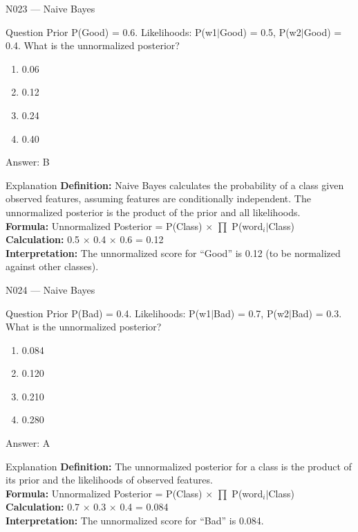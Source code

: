 \documentclass[aspectratio=169,8pt]{beamer}
\begin{document}
	\begin{frame}{N023 --- Naive Bayes}
		\begin{block}{Question}
			Prior P(Good) = 0.6. Likelihoods: P(w1$|$Good) = 0.5, P(w2$|$Good) = 0.4. What is the unnormalized posterior?
			\begin{enumerate}
				\item 0.06
				\item 0.12
				\item 0.24
				\item 0.40
			\end{enumerate}
		\end{block}
		\begin{exampleblock}{Answer: B}\end{exampleblock}
		\begin{block}{Explanation}
			\textbf{Definition:} Naive Bayes calculates the probability of a class given observed features, assuming features are conditionally independent. The unnormalized posterior is the product of the prior and all likelihoods.\\
			\textbf{Formula:} Unnormalized Posterior = P(Class) $\times$ $\prod$ P(word$_{i}$$|$Class)\\
			\textbf{Calculation:} 0.5 $\times$ 0.4 $\times$ 0.6 = 0.12\\
			\textbf{Interpretation:} The unnormalized score for ``Good'' is 0.12 (to be normalized against other classes).
		\end{block}
	\end{frame}
	
	\begin{frame}{N024 --- Naive Bayes}
		\begin{block}{Question}
			Prior P(Bad) = 0.4. Likelihoods: P(w1$|$Bad) = 0.7, P(w2$|$Bad) = 0.3. What is the unnormalized posterior?
			\begin{enumerate}
				\item 0.084
				\item 0.120
				\item 0.210
				\item 0.280
			\end{enumerate}
		\end{block}
		\begin{exampleblock}{Answer: A}\end{exampleblock}
		\begin{block}{Explanation}
			\textbf{Definition:} The unnormalized posterior for a class is the product of its prior and the likelihoods of observed features.\\
			\textbf{Formula:} Unnormalized Posterior = P(Class) $\times$ $\prod$ P(word$_{i}$$|$Class)\\
			\textbf{Calculation:} 0.7 $\times$ 0.3 $\times$ 0.4 = 0.084\\
			\textbf{Interpretation:} The unnormalized score for ``Bad'' is 0.084.
		\end{block}
	\end{frame}
	
\end{document}
